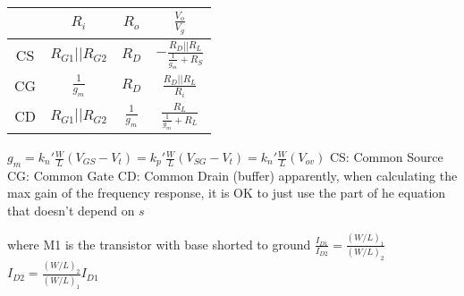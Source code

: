 \documentclass[12pt]{article}
\begin{document}
\begin{spacing}{0.8}
\begin{multicols*}{2}
\begin{flushleft}
\begin{outline}[longenum]
\\
{\def\arraystretch{3}
  \begin{tabular}{|c|c|c|c|} \hline
  & $R_i$ & $R_o$ & $\frac{V_o}{V_g}$ \\ \hline
  \vspace{4px} CS & $R_{G1}||R_{G2}$ & $R_D$           & $-\frac{R_D||R_L}{\frac{1}{g_m}+R_S}$ \\ \hline
  \vspace{4px} CG & $\frac{1}{g_m}$  & $R_D$           & $\frac{R_D||R_L}{R_i}$                \\ \hline
  \vspace{4px} CD & $R_{G1}||R_{G2}$ & $\frac{1}{g_m}$ & $\frac{R_L}{\frac{1}{g_m}+R_L}$       \\ \hline
  \end{tabular}
}

  \1 $g_m
    = k_n' \frac{W}{L}(V_{GS}-V_t)
    = k_p' \frac{W}{L}(V_{SG}-V_t)
    = k_n' \frac{W}{L}(V_{ov})
    $
  \1 CS: Common Source
  \1 CG: Common Gate
  \1 CD: Common Drain (buffer)
  \1 apparently, when calculating the max gain of the frequency response, it is OK to just use the part of he equation that doesn't depend on $s$

  \1 where M1 is the transistor with base shorted to ground
  \1 $\frac{I_{D1}}{I_{D2}}=\frac{(W/L)_1}{(W/L)_2}$
  \1 $I_{D2} = \frac{(W/L)_2}{(W/L)_1} I_{D1}$



\end{outline}
\end{flushleft}
\end{multicols*}
\end{spacing}
\end{document}
